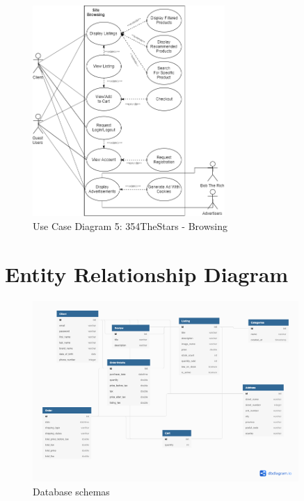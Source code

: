 \documentclass[11pt]{article}
\begin{document}
\begin{figure}[htbp]
    \centering
    \includegraphics[width=0.65\textwidth]{Diagrams/Use_Case/ucd4.png}
    \caption{Use Case Diagram 5: 354TheStars - Browsing }
    \label{fig:ucd5}
\end{figure}


\clearpage
\section{Entity Relationship Diagram}
\begin{figure}[ht!]
    \centering
    \includegraphics[width=0.9\textwidth]{Diagrams/ER/ER_Diagram_Typed.png}
    \caption{Database schemas}
    \label{fig:ER_Typed}
\end{figure}
\end{document}
